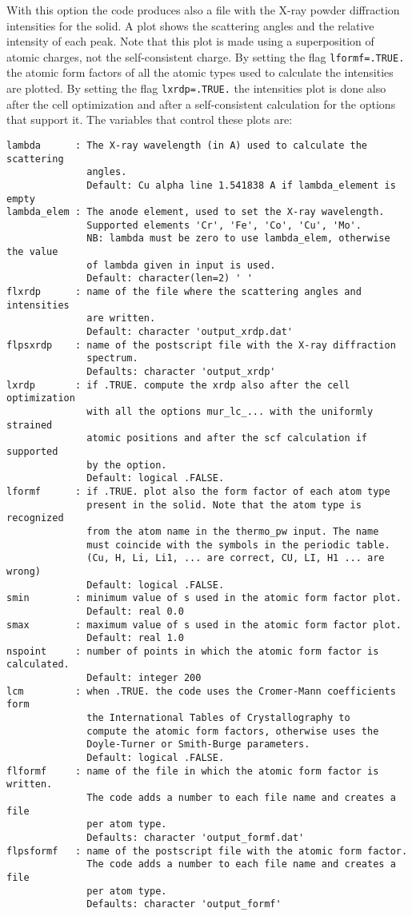 \documentclass[12pt,a4paper]{article}
\begin{document}
With this option the code produces also a file with the X-ray
powder diffraction intensities for the solid. A plot shows the 
scattering angles and the relative intensity of each peak. Note 
that this plot is made using 
a superposition of atomic charges, not the self-consistent charge.
By setting the flag \texttt{lformf=.TRUE.} the atomic form factors of all 
the atomic types used to calculate the intensities are plotted. 
By setting the flag \texttt{lxrdp=.TRUE.} the intensities plot is done also 
after the cell optimization and after a self-consistent calculation 
for the options that support it.
The variables that control these plots are:
\begin{verbatim}
lambda      : The X-ray wavelength (in A) used to calculate the scattering 
              angles.
              Default: Cu alpha line 1.541838 A if lambda_element is empty
lambda_elem : The anode element, used to set the X-ray wavelength.
              Supported elements 'Cr', 'Fe', 'Co', 'Cu', 'Mo'.
              NB: lambda must be zero to use lambda_elem, otherwise the value
              of lambda given in input is used.
              Default: character(len=2) ' ' 
flxrdp      : name of the file where the scattering angles and intensities 
              are written.
              Default: character 'output_xrdp.dat'
flpsxrdp    : name of the postscript file with the X-ray diffraction
              spectrum.
              Defaults: character 'output_xrdp'
lxrdp       : if .TRUE. compute the xrdp also after the cell optimization
              with all the options mur_lc_... with the uniformly strained
              atomic positions and after the scf calculation if supported
              by the option. 
              Default: logical .FALSE.
lformf      : if .TRUE. plot also the form factor of each atom type
              present in the solid. Note that the atom type is recognized
              from the atom name in the thermo_pw input. The name
              must coincide with the symbols in the periodic table. 
              (Cu, H, Li, Li1, ... are correct, CU, LI, H1 ... are wrong)
              Default: logical .FALSE.
smin        : minimum value of s used in the atomic form factor plot.
              Default: real 0.0
smax        : maximum value of s used in the atomic form factor plot.
              Default: real 1.0
nspoint     : number of points in which the atomic form factor is calculated.
              Default: integer 200
lcm         : when .TRUE. the code uses the Cromer-Mann coefficients form
              the International Tables of Crystallography to
              compute the atomic form factors, otherwise uses the 
              Doyle-Turner or Smith-Burge parameters.
              Default: logical .FALSE.
flformf     : name of the file in which the atomic form factor is written. 
              The code adds a number to each file name and creates a file
              per atom type.
              Defaults: character 'output_formf.dat'
flpsformf   : name of the postscript file with the atomic form factor.  
              The code adds a number to each file name and creates a file
              per atom type.
              Defaults: character 'output_formf'
\end{verbatim}
\end{document}
